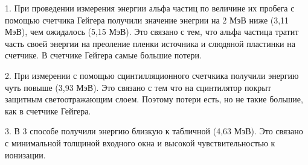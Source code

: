 \documentclass[a4paper]{article}
\begin{document}
1. При проведении измерения энергии альфа частиц по величине их пробега с помощью счетчика Гейгера получили значение энегрии на 2 МэВ ниже (3,11 МэВ), чем ожидалось (5,15 МэВ).
Это связано с тем, что альфа частица тратит часть своей энергии на преоление пленки источника и слюдяной пластинки на счетчике. В счетчике Гейгера самые большие потери.


2. При измерении с помощью сцинтилляционного счетчкика получили энергию чуть повыше (3,93 МэВ). Это связано с тем что на сцинтилятор покрыт защитным светоотражающим слоем. Поэтому потери есть, но не такие большие, как в счетчике Гейгера.


3. В 3 способе получили энергию близкую к табличной (4,63 МэВ). Это связано с минимальной толщиной входного окна и высокой чувствительностью к ионизации.
\end{document}
